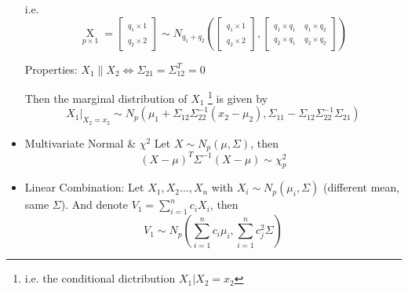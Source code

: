 \begin{itemize}[topsep=6pt,itemsep=4pt]
            i.e. 
        \[
            \mathop{X}\limits_{p\times 1}=\begin{bmatrix}
                \mathop{X_1 }\limits_{q_1\times 1}\\
                \mathop{X_2 }\limits_{q_2\times 2}  
            \end{bmatrix}  
            \sim
            N_{q_1+q_2}\left(\begin{bmatrix}
                \mathop{\mu_1 }\limits_{q_1\times 1}\\
                \mathop{\mu_2 }\limits_{q_2\times 2}  
            \end{bmatrix},\begin{bmatrix}
                \mathop{\Sigma_{11} }\limits_{q_1\times q_1}&\mathop{\Sigma_{12} }\limits_{q_1\times q_2} \\
                \mathop{\Sigma_{21} }\limits_{q_2\times q_1}&\mathop{\Sigma_{22} }\limits_{q_2\times q_2}   
            \end{bmatrix}  
                \right)
        \]
            
        Properties: $ X_1\parallel X_2\Leftrightarrow \Sigma _{21}=\Sigma _{12}^T=0  $

        Then the marginal distribution of $ X_1 $ \footnote{i.e. the conditional dictribution $ X_1|X_2=x_2 $} is given by
        \[
            X_1|_{X_2=x_2}\sim N_p(\mu_1+\Sigma _{12}\Sigma _{22}^{-1}(x_2-\mu_2),\Sigma _{11}-\Sigma _{12}\Sigma _{22}^{-1}\Sigma _{21})
        \]

        \item Multivariate Normal \& $ \chi^2 $
         Let $ X\sim N_p(\mu,\Sigma ) $, then 
         \[
             (X-\mu)^T\Sigma ^{-1}(X-\mu)\sim \chi_p^2 
         \]
         
         \item Linear Combination:
        Let $ X_1,X_2\ldots,X_n $ with $ X_i\sim N_p(\mu_i,\Sigma ) $ (different mean, same $ \Sigma  $). And denote $ V_1=\sum_{i=1}^nc_iX_i $, then
        \[
            V_1\sim N_p(\sum_{i=1}^n c_i\mu_i,\sum_{i=1}^nc_j^2\Sigma ) 
        \]
        
        
        
        
        
        
    \end{itemize}
    
        







